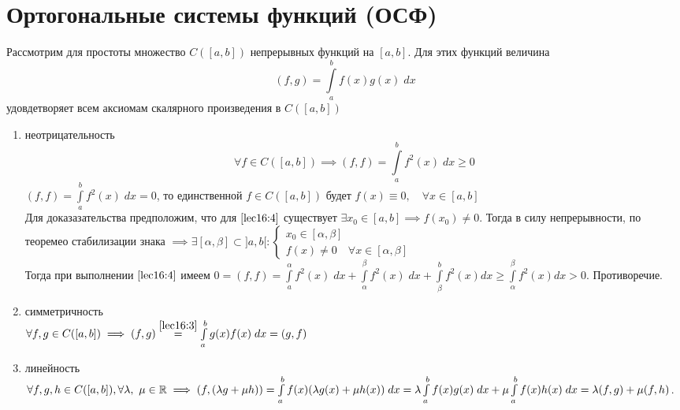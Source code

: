\documentclass[../../main.tex]{subfiles}
\begin{document}
	 \section{Ортогональные системы функций (ОСФ)}
	 Рассмотрим для простоты множество $C(\left[a, b\right])$ непрерывных функций 
	 на
	  $\left[a, b\right]$. Для этих функций величина
	   \begin{equation}
	 \label{lec16:3}
	 	 (f, g) = \int \limits_a^b f(x)g(x)\; dx
	  \end{equation}
	  удовдетворяет всем аксиомам скалярного произведения в $C(\left[a, 
	  b\right])$
	 \begin{enumerate}
	 \item неотрицательность
	 \begin{equation}
	 \label{lec16:4}
	 \forall f \in C(\left[a, b\right]) \implies (f, f) = \int\limits_a^bf^2(x)\; 
	 dx \ge 0 
	 \end{equation}
	 $(f, f) = \int\limits_a^bf^2(x)\; dx = 0 $, то единственной $f \in 
	 C(\left[a,
	  b\right]) $ будет $f(x) \equiv 0, \quad \forall x \in \left[a, b\right]$\\
	 Для доказазательства предположим, что для $\eqref{lec16:4}$ существует 
	 $\exists
	  x_0 \in \left[a, b\right] \implies f(x_0) \neq 0$. Тогда в силу 
	  непрерывности,
	   по теоремео стабилизации знака $\implies \exists \left[\alpha, \beta 
	   \right]
	    \subset ]a, b [ : \begin{cases}
	 x_0 \in \left[\alpha, \beta \right]\\
	 f(x) \neq 0 \quad \forall x \in \left[\alpha, \beta \right] 
	 \end{cases}$\\
	 Тогда при выполнении $\eqref{lec16:4}$ имеем $0 = (f, f) = 
	 \int\limits_a^\alpha
	  f^2(x)\; dx + \int\limits_\alpha^\beta f^2(x) \; dx + \int\limits_\beta ^b 
	  f^2(x)dx \geq
	   \int\limits_\alpha^\beta f^2(x)dx  > 0$. Противоречие.
	 \item симметричность\\
	 $\forall f, g \in C(\left[a, b\right]) \implies(f, g)
	  \stackrel{\eqref{lec16:3}}{=} \int\limits_a^b g(x)f(x)\; dx = (g, f) $
	 \item линейность\\
	 $\forall f, g, h \in C(\left[a, b\right]), \forall \lambda, \ \mu \in \mathbb{R} 
	 \implies
	  (f, (\lambda g + \mu h)) = \int \limits_a^bf(x) (\lambda g(x) + \mu h(x)) 
	  \; dx =
	   \lambda \int \limits_a^bf(x)g(x)\; dx + \mu \int \limits_a^bf(x)h(x)\; dx 
	   = \lambda(f,
	    g) + \mu (f, h)$.\\
\end{enumerate}
\end{document}
